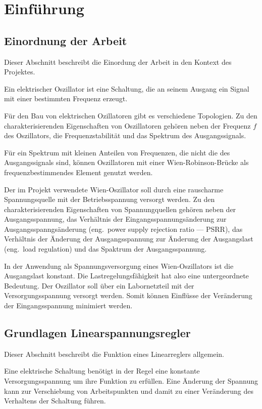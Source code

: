 \chapter{Einführung} 

\section{Einordnung der Arbeit}
Dieser Abschnitt beschreibt die Einordung der Arbeit in den Kontext des 
Projektes.

Ein elektrischer Oszillator ist eine Schaltung, die an seinem Ausgang ein
Signal mit einer bestimmten Frequenz erzeugt.

Für den Bau von elektrischen Ozillatoren gibt es verschiedene Topologien.
Zu den charakterisierenden Eigenschaften von Oszillatoren gehören neben
der Frequenz $f$ des Oszillators, die Frequenzstabilität und das Spektrum des 
Ausgangssignals.

Für ein Spektrum mit kleinen Anteilen von Frequenzen, die nicht die des 
Ausgangssignals sind, können Oszillatoren mit einer Wien-Robinson-Brücke als 
frequenzbestimmendes Element genutzt werden.

Der im Projekt verwendete Wien-Oszillator soll durch eine rauscharme 
Spannungsquelle mit der Betriebsspannung versorgt werden.
Zu den charakterisierenden Eigenschaften von Spannungquellen gehören neben der
Ausgangsspannung, das Verhältnis der Eingangsspannungsänderung zur 
Ausgangsspanngsänderung (eng.\ power supply rejection ratio — PSRR),
das Verhältnis der Änderung der Ausgangsspannung zur Änderung der Ausgangslast
(eng.\ load regulation) und das Spaktrum der Ausgangsspannung.

In der Anwendung als Spannungsversorgung eines Wien-Oszillators ist die 
Ausgangslast konstant. Die Lastregelungsfähigkeit hat also eine untergeordnete
Bedeutung. Der Oszillator soll über ein Labornetzteil mit der 
Versorgungsspannung versorgt werden. Somit können Einflüsse der 
Veränderung der Eingangsspannung minimiert werden. 

\section{Grundlagen Linearspannungsregler}
Dieser Abschnitt beschreibt die Funktion eines Linearreglers allgemein.

Eine elektrische Schaltung benötigt in der Regel eine konstante 
Versorgungsspannung um ihre Funktion zu erfüllen.
Eine Änderung der Spannung kann zur Verschiebung von Arbeitspunkten und damit
zu einer Veränderung des Verhaltens der Schaltung führen.

